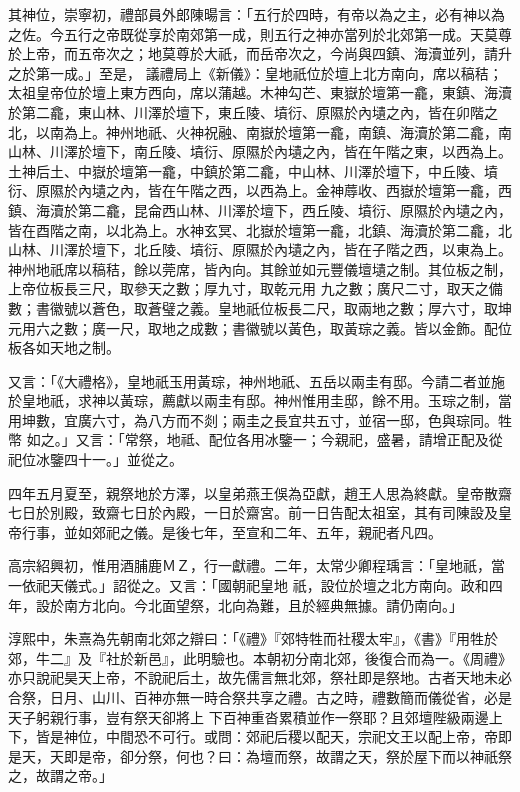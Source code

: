 \begin{pinyinscope}
 其神位，崇寧初，禮部員外郎陳暘言：「五行於四時，有帝以為之主，必有神以為之佐。今五行之帝既從享於南郊第一成，則五行之神亦當列於北郊第一成。天莫尊於上帝，而五帝次之；地莫尊於大祇，而岳帝次之，今尚與四鎮、海瀆並列，請升之於第一成。」至是，
 議禮局上《新儀》：皇地祇位於壇上北方南向，席以稿秸；太祖皇帝位於壇上東方西向，席以蒲越。木神勾芒、東嶽於壇第一龕，東鎮、海瀆於第二龕，東山林、川澤於壇下，東丘陵、墳衍、原隰於內壝之內，皆在卯階之北，以南為上。神州地祇、火神祝融、南嶽於壇第一龕，南鎮、海瀆於第二龕，南山林、川澤於壇下，南丘陵、墳衍、原隰於內壝之內，皆在午階之東，以西為上。土神后土、中嶽於壇第一龕，中鎮於第二龕，中山林、川澤於壇下，中丘陵、墳
 衍、原隰於內壝之內，皆在午階之西，以西為上。金神蓐收、西嶽於壇第一龕，西鎮、海瀆於第二龕，昆侖西山林、川澤於壇下，西丘陵、墳衍、原隰於內壝之內，皆在酉階之南，以北為上。水神玄冥、北嶽於壇第一龕，北鎮、海瀆於第二龕，北山林、川澤於壇下，北丘陵、墳衍、原隰於內壝之內，皆在子階之西，以東為上。神州地祇席以稿秸，餘以莞席，皆內向。其餘並如元豐儀壇壝之制。其位板之制，上帝位板長三尺，取參天之數；厚九寸，取乾元用
 九之數；廣尺二寸，取天之備數；書徽號以蒼色，取蒼璧之義。皇地祇位板長二尺，取兩地之數；厚六寸，取坤元用六之數；廣一尺，取地之成數；書徽號以黃色，取黃琮之義。皆以金飾。配位板各如天地之制。



 又言：「《大禮格》，皇地祇玉用黃琮，神州地祇、五岳以兩圭有邸。今請二者並施於皇地祇，求神以黃琮，薦獻以兩圭有邸。神州惟用圭邸，餘不用。玉琮之制，當用坤數，宜廣六寸，為八方而不剡；兩圭之長宜共五寸，並宿一邸，色與琮同。牲幣
 如之。」又言：「常祭，地祗、配位各用冰鑒一；今親祀，盛暑，請增正配及從祀位冰鑒四十一。」並從之。



 四年五月夏至，親祭地於方澤，以皇弟燕王俁為亞獻，趙王人思為終獻。皇帝散齋七日於別殿，致齋七日於內殿，一日於齋宮。前一日告配太祖室，其有司陳設及皇帝行事，並如郊祀之儀。是後七年，至宣和二年、五年，親祀者凡四。



 高宗紹興初，惟用酒脯鹿ＭＺ，行一獻禮。二年，太常少卿程瑀言：「皇地祇，當一依祀天儀式。」詔從之。又言：「國朝祀皇地
 祇，設位於壇之北方南向。政和四年，設於南方北向。今北面望祭，北向為難，且於經典無據。請仍南向。」



 淳熙中，朱熹為先朝南北郊之辯曰：「《禮》『郊特牲而社稷太牢』，《書》『用牲於郊，牛二』及『社於新邑』，此明驗也。本朝初分南北郊，後復合而為一。《周禮》亦只說祀昊天上帝，不說祀后土，故先儒言無北郊，祭社即是祭地。古者天地未必合祭，日月、山川、百神亦無一時合祭共享之禮。古之時，禮數簡而儀從省，必是天子躬親行事，豈有祭天卻將上
 下百神重沓累積並作一祭耶？且郊壇陛級兩邊上下，皆是神位，中間恐不可行。或問：郊祀后稷以配天，宗祀文王以配上帝，帝即是天，天即是帝，卻分祭，何也？曰：為壇而祭，故謂之天，祭於屋下而以神祇祭之，故謂之帝。」




\end{pinyinscope}
